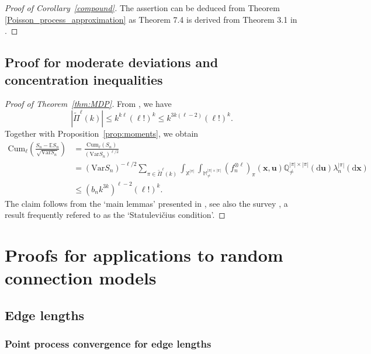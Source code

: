 \documentclass{article}
\theoremstyle{definition}
\numberwithin{equation}{section}
\theoremstyle{remark}
\newcommand{\Var}{\mathrm{Var}}
\newcommand{\cum}{\mathrm{Cum}}
\begin{document}
\begin{proof}[Proof of Corollary~\ref{compound}]
The assertion can be deduced from Theorem \ref{Poisson_process_approximation} as Theorem 7.4 is derived from Theorem 3.1 in \cite{dst}.
\end{proof}
\subsection{Proof for moderate deviations and concentration inequalities }%

\begin{proof}[Proof of Theorem~\ref{thm:MDP}]
	From \cite[Proposition~6.1]{schulte2}, we have 
	$$
	|\widetilde{\Pi}^\ell(k)|\le k^{k\ell}(\ell!)^k\le k^{3k(\ell-2)}(\ell!)^k.
	$$
	Together with Proposition~\ref{prop:moments}, we obtain 
\begin{align}
	\cum_\ell\left(\frac{S_n-\mathbb{E}S_n}{\sqrt{\Var S_n}}\right)
	&=\frac{\cum_\ell(S_n)}{(\Var S_n)^{\ell/2}}\nonumber\\
	&=(\Var S_n)^{-\ell/2}\sum_{\pi\in\widetilde{\Pi}^\ell(k)}\int_{\mathbb{X}^{|\pi|}}\int_{\mathbb{M}^{|\pi|\times|\pi|}_{\ne}}(f_n^{\otimes\ell})_{\pi}(\bm{x},\bm{u})\mathbb{Q}^{|\pi|\times|\pi|}_{\ne}(\mathrm{d}\bm{u})\lambda_n^{|\pi|}(\mathrm{d}\bm{x})\nonumber\\
	&\le (b_nk^{3k})^{\ell-2}(\ell!)^k.
\end{align}
The claim follows from the `main lemmas' presented in \cite{saulis}, see also the survey \cite{doering}, a result frequently refered to as the `Statulevičius condition'.
\end{proof}


\section{Proofs for applications to random connection models}\label{Sec:pfRCM}
\subsection{Edge lengths}

\subsubsection{Point process convergence for edge lengths}
\end{document}
